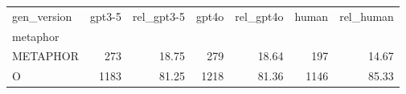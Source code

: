 \begin{tabular}{lrrrrrr}
\toprule
gen_version & gpt3-5 & rel_gpt3-5 & gpt4o & rel_gpt4o & human & rel_human \\
metaphor &  &  &  &  &  &  \\
\midrule
METAPHOR & 273 & 18.75 & 279 & 18.64 & 197 & 14.67 \\
O & 1183 & 81.25 & 1218 & 81.36 & 1146 & 85.33 \\
\bottomrule
\end{tabular}
